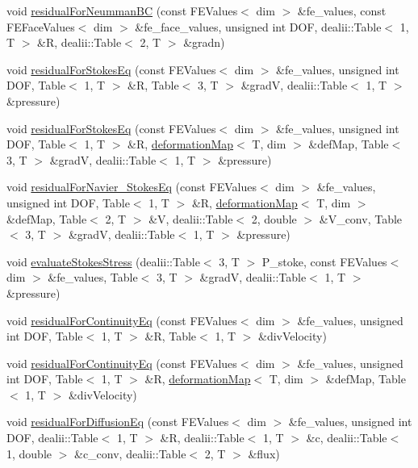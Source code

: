 \begin{DoxyCompactItemize}
\item 
void \mbox{\hyperlink{class_residual_a4c8fd158c8034b25780abfe785755baa}{residual\+For\+Neumman\+BC}} (const F\+E\+Values$<$ dim $>$ \&fe\+\_\+values, const F\+E\+Face\+Values$<$ dim $>$ \&fe\+\_\+face\+\_\+values, unsigned int D\+OF, dealii\+::\+Table$<$ 1, T $>$ \&R, dealii\+::\+Table$<$ 2, T $>$ \&gradn)
\item 
void \mbox{\hyperlink{class_residual_a9a8f493fb66e0bd394948af13a27d821}{residual\+For\+Stokes\+Eq}} (const F\+E\+Values$<$ dim $>$ \&fe\+\_\+values, unsigned int D\+OF, Table$<$ 1, T $>$ \&R, Table$<$ 3, T $>$ \&gradV, dealii\+::\+Table$<$ 1, T $>$ \&pressure)
\item 
void \mbox{\hyperlink{class_residual_a95ad863ab9066d2dbfef9db3907a911f}{residual\+For\+Stokes\+Eq}} (const F\+E\+Values$<$ dim $>$ \&fe\+\_\+values, unsigned int D\+OF, Table$<$ 1, T $>$ \&R, \mbox{\hyperlink{structdeformation_map}{deformation\+Map}}$<$ T, dim $>$ \&def\+Map, Table$<$ 3, T $>$ \&gradV, dealii\+::\+Table$<$ 1, T $>$ \&pressure)
\item 
void \mbox{\hyperlink{class_residual_a34f1f680e957e21ac47c35f404e9fd6a}{residual\+For\+Navier\+\_\+\+Stokes\+Eq}} (const F\+E\+Values$<$ dim $>$ \&fe\+\_\+values, unsigned int D\+OF, Table$<$ 1, T $>$ \&R, \mbox{\hyperlink{structdeformation_map}{deformation\+Map}}$<$ T, dim $>$ \&def\+Map, Table$<$ 2, T $>$ \&V, dealii\+::\+Table$<$ 2, double $>$ \&V\+\_\+conv, Table$<$ 3, T $>$ \&gradV, dealii\+::\+Table$<$ 1, T $>$ \&pressure)
\item 
void \mbox{\hyperlink{class_residual_a7e33928364e99df9a42db58752aca7f3}{evaluate\+Stokes\+Stress}} (dealii\+::\+Table$<$ 3, T $>$ P\+\_\+stoke, const F\+E\+Values$<$ dim $>$ \&fe\+\_\+values, Table$<$ 3, T $>$ \&gradV, dealii\+::\+Table$<$ 1, T $>$ \&pressure)
\item 
void \mbox{\hyperlink{class_residual_a882f4595a6547599cfe8f65897f45896}{residual\+For\+Continuity\+Eq}} (const F\+E\+Values$<$ dim $>$ \&fe\+\_\+values, unsigned int D\+OF, Table$<$ 1, T $>$ \&R, Table$<$ 1, T $>$ \&div\+Velocity)
\item 
void \mbox{\hyperlink{class_residual_afddbdda003424f242266894fdd1f7b1a}{residual\+For\+Continuity\+Eq}} (const F\+E\+Values$<$ dim $>$ \&fe\+\_\+values, unsigned int D\+OF, Table$<$ 1, T $>$ \&R, \mbox{\hyperlink{structdeformation_map}{deformation\+Map}}$<$ T, dim $>$ \&def\+Map, Table$<$ 1, T $>$ \&div\+Velocity)
\item 
void \mbox{\hyperlink{class_residual_a224462af849f5a1927bc90eb3795f2f2}{residual\+For\+Diffusion\+Eq}} (const F\+E\+Values$<$ dim $>$ \&fe\+\_\+values, unsigned int D\+OF, dealii\+::\+Table$<$ 1, T $>$ \&R, dealii\+::\+Table$<$ 1, T $>$ \&c, dealii\+::\+Table$<$ 1, double $>$ \&c\+\_\+conv, dealii\+::\+Table$<$ 2, T $>$ \&flux)

\end{DoxyCompactItemize}
